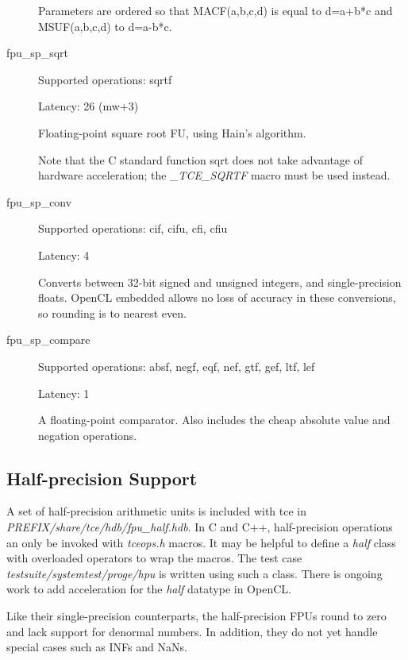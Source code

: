 \documentclass[twoside]{tceusermanual}
\begin{document}
\begin{description}
Parameters are ordered so that MACF(a,b,c,d) is equal to d=a+b*c and MSUF(a,b,c,d) to d=a-b*c.

\item[fpu\_sp\_sqrt]

Supported operations:         sqrtf

Latency:             26 (mw+3)

Floating-point square root FU, using Hain's algorithm.

Note that the C standard function sqrt does not take advantage of hardware acceleration; the
\emph{\_TCE\_SQRTF} macro must be used instead.

\item[fpu\_sp\_conv]

Supported operations:         cif, cifu, cfi, cfiu

Latency:             4

Converts between 32-bit signed and unsigned integers, and single-precision floats. OpenCL embedded allows no loss of accuracy in these conversions, so rounding is to nearest even.

\item[fpu\_sp\_compare]

Supported operations:         absf, negf, eqf, nef, gtf, gef, ltf, lef

Latency:             1

A floating-point comparator. Also includes the cheap absolute value and negation operations.


\end{description}

\subsection{Half-precision Support}

A set of half-precision arithmetic units is included with tce in \emph{PREFIX/share/tce/hdb/fpu\_half.hdb}. In C and C++,
half-precision operations an only be invoked with \emph{tceops.h} macros. It may be helpful to define a \emph{half}
class with overloaded operators to wrap the macros. The test case \emph{testsuite/systemtest/proge/hpu} is written
using such a class. There is ongoing work to add acceleration for the \emph{half} datatype in OpenCL.

Like their single-precision counterparts, the half-precision FPUs round to zero and lack support for denormal numbers.
In addition, they do not yet handle special cases such as INFs and NaNs.
\end{document}
